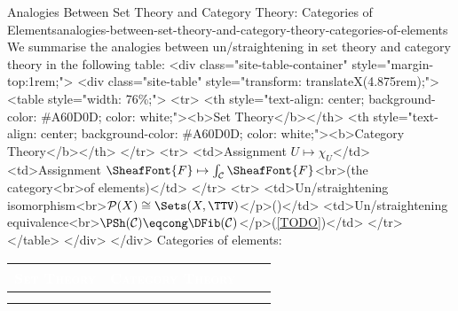 \begin{remark}{Analogies Between Set Theory and Category Theory: Categories of Elements}{analogies-between-set-theory-and-category-theory-categories-of-elements}%
    We summarise the analogies between un/straightening in set theory and category theory in the following table:
    <div class="site-table-container" style="margin-top:1rem;">
      <div class="site-table" style="transform: translateX(4.875rem);">
        <table style="width: 76\%;">
          <tr>
            <th style="text-align: center; background-color: #A60D0D; color: white;"><b>Set Theory</b></th>
            <th style="text-align: center; background-color: #A60D0D; color: white;"><b>Category Theory</b></th>
          </tr>
          <tr>
            <td>Assignment $U\mapsto\chi_{U}$</td>
            <td>Assignment $\SheafFont{F}\mapsto\int_{\mathcal{C}}\SheafFont{F}$<br>(the category<br>of elements)</td>
          </tr>
          <tr>
            <td>Un/straightening isomorphism<br>$\mathcal{P}(X)\cong\Sets(X,\TTV)$</p>()</td>
            <td>Un/straightening equivalence<br>$\PSh(\mathcal{C})\eqcong\DFib(\mathcal{C})$</p>(\cref{TODO})</td>
          </tr>
        </table>
      </div>
    </div>
    Categories of elements:
    \begingroup%
    \setlength\cellspacetoplimit{3pt}
    \setlength\cellspacebottomlimit{3pt}
    \renewcommand{\arraystretch}{1.2}
    \begin{center}
        \begin{tabular}{|Sc|Sc|}\hline{}
            \textcolor{white}{\textbf{\textsc{Set Theory}}}                                                                      & \textcolor{white}{\textbf{\textsc{Category Theory}}}                                                                                                                        \\\hline{}
                                                                                                    &                                           \\

\end{tabular}
\end{center}
\end{remark}

